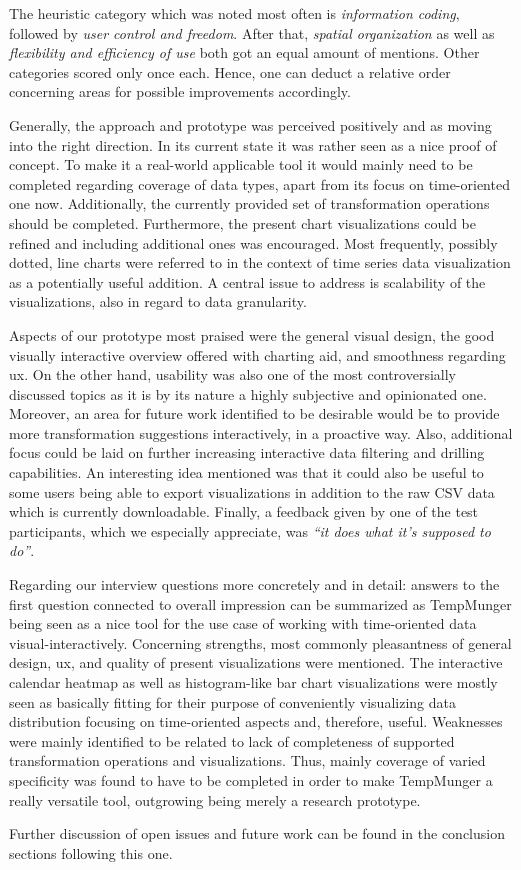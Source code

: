 The heuristic category which was noted most often is \emph{information coding}, followed by \emph{user control and freedom}.
After that, \emph{spatial organization} as well as \emph{flexibility and efficiency of use} both got an equal amount of mentions.
Other categories scored only once each.
Hence, one can deduct a relative order concerning areas for possible improvements accordingly.

Generally, the approach and prototype was perceived positively and as moving into the right direction.
In its current state it was rather seen as a nice proof of concept.
To make it a real-world applicable tool it would mainly need to be completed regarding coverage of data types, apart from its focus on time-oriented one now.
Additionally, the currently provided set of transformation operations should be completed.
Furthermore, the present chart visualizations could be refined and including additional ones was encouraged.
Most frequently, possibly dotted, line charts were referred to in the context of time series data visualization as a potentially useful addition.
A central issue to address is scalability of the visualizations, also in regard to data granularity.

Aspects of our prototype most praised were the general visual design, the good visually interactive overview offered with charting aid, and smoothness regarding \gls{ux}.
On the other hand, usability was also one of the most controversially discussed topics as it is by its nature a highly subjective and opinionated one.
Moreover, an area for future work identified to be desirable would be to provide more transformation suggestions interactively, in a proactive way.
Also, additional focus could be laid on further increasing interactive data filtering and drilling capabilities.
An interesting idea mentioned was that it could also be useful to some users being able to export visualizations in addition to the raw \textsc{CSV} data which is currently downloadable.
Finally, a feedback given by one of the test participants, which we especially appreciate, was \emph{``it does what it's supposed to do''}.

Regarding our interview questions more concretely and in detail:
answers to the first question connected to overall impression can be summarized as TempMunger being seen as a nice tool for the use case of working with time-oriented data visual-interactively.
Concerning strengths, most commonly pleasantness of general design, \gls{ux}, and quality of present visualizations were mentioned.
The interactive calendar heatmap as well as histogram-like bar chart visualizations were mostly seen as basically fitting for their purpose of conveniently visualizing data distribution focusing on time-oriented aspects and, therefore, useful.
Weaknesses were mainly identified to be related to lack of completeness of supported transformation operations and visualizations.
Thus, mainly coverage of varied specificity was found to have to be completed in order to make TempMunger a really versatile tool, outgrowing being merely a research prototype.

Further discussion of open issues and future work can be found in the conclusion sections following this one.
